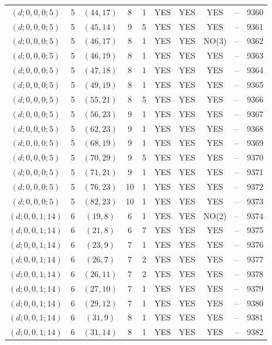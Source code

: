\begin{longtable}{|c|c|c|c|c|c|c|c|c|c|}
$(d; 0, 0, 0; 5)$ & 5 & $(44, 17)$ & 8 & 1 & YES & YES & YES & -- & 9360\\
$(d; 0, 0, 0; 5)$ & 5 & $(45, 14)$ & 9 & 5 & YES & YES & YES & -- & 9361\\
$(d; 0, 0, 0; 5)$ & 5 & $(46, 17)$ & 8 & 1 & YES & YES & NO(3) & -- & 9362\\
$(d; 0, 0, 0; 5)$ & 5 & $(46, 19)$ & 8 & 1 & YES & YES & YES & -- & 9363\\
$(d; 0, 0, 0; 5)$ & 5 & $(47, 18)$ & 8 & 1 & YES & YES & YES & -- & 9364\\
$(d; 0, 0, 0; 5)$ & 5 & $(49, 19)$ & 8 & 1 & YES & YES & YES & -- & 9365\\
$(d; 0, 0, 0; 5)$ & 5 & $(55, 21)$ & 8 & 5 & YES & YES & YES & -- & 9366\\
$(d; 0, 0, 0; 5)$ & 5 & $(56, 23)$ & 9 & 1 & YES & YES & YES & -- & 9367\\
$(d; 0, 0, 0; 5)$ & 5 & $(62, 23)$ & 9 & 1 & YES & YES & YES & -- & 9368\\
$(d; 0, 0, 0; 5)$ & 5 & $(68, 19)$ & 9 & 1 & YES & YES & YES & -- & 9369\\
$(d; 0, 0, 0; 5)$ & 5 & $(70, 29)$ & 9 & 5 & YES & YES & YES & -- & 9370\\
$(d; 0, 0, 0; 5)$ & 5 & $(71, 21)$ & 9 & 1 & YES & YES & YES & -- & 9371\\
$(d; 0, 0, 0; 5)$ & 5 & $(76, 23)$ & 10 & 1 & YES & YES & YES & -- & 9372\\
$(d; 0, 0, 0; 5)$ & 5 & $(82, 23)$ & 10 & 1 & YES & YES & YES & -- & 9373\\
$(d; 0, 0, 1; 14)$ & 6 & $(19, 8)$ & 6 & 1 & YES & YES & NO(2) & -- & 9374\\
$(d; 0, 0, 1; 14)$ & 6 & $(21, 8)$ & 6 & 7 & YES & YES & YES & -- & 9375\\
$(d; 0, 0, 1; 14)$ & 6 & $(23, 9)$ & 7 & 1 & YES & YES & YES & -- & 9376\\
$(d; 0, 0, 1; 14)$ & 6 & $(26, 7)$ & 7 & 2 & YES & YES & YES & -- & 9377\\
$(d; 0, 0, 1; 14)$ & 6 & $(26, 11)$ & 7 & 2 & YES & YES & YES & -- & 9378\\
$(d; 0, 0, 1; 14)$ & 6 & $(27, 10)$ & 7 & 1 & YES & YES & YES & -- & 9379\\
$(d; 0, 0, 1; 14)$ & 6 & $(29, 12)$ & 7 & 1 & YES & YES & YES & -- & 9380\\
$(d; 0, 0, 1; 14)$ & 6 & $(31, 9)$ & 8 & 1 & YES & YES & YES & -- & 9381\\
$(d; 0, 0, 1; 14)$ & 6 & $(31, 14)$ & 8 & 1 & YES & YES & YES & -- & 9382\\

\end{longtable}
